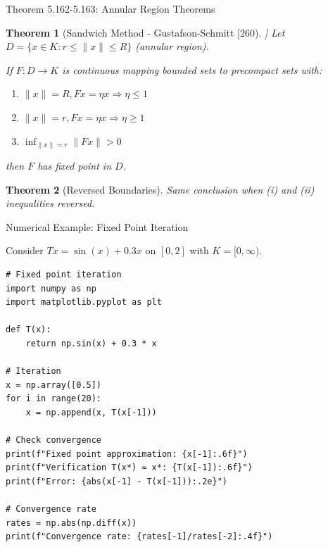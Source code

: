 \documentclass[aspectratio=169,10pt]{beamer}
\theoremstyle{plain}
\newtheorem*{theorem*}{Theorem}
\begin{document}
\begin{frame}{Theorem 5.162-5.163: Annular Region Theorems}
  \begin{theorem*}[Sandwich Method - Gustafson-Schmitt [260]]
    Let $D = \{x \in K : r \leq \|x\| \leq R\}$ (annular region).

    If $F: D \to K$ is continuous mapping bounded sets to precompact sets with:
    \begin{enumerate}
      \item $\|x\| = R, Fx = \eta x \Rightarrow \eta \leq 1$
      \item $\|x\| = r, Fx = \eta x \Rightarrow \eta \geq 1$
      \item $\inf_{\|x\|=r} \|Fx\| > 0$
    \end{enumerate}

    then $F$ has fixed point in $D$.
  \end{theorem*}

  \vspace{0.8em}

  \begin{theorem*}[Reversed Boundaries]
    Same conclusion when (i) and (ii) inequalities reversed.
  \end{theorem*}
\end{frame}

\begin{frame}[fragile]{Numerical Example: Fixed Point Iteration}
  \begin{example*}
    Consider $Tx = \sin(x) + 0.3x$ on $[0, 2]$ with $K = [0, \infty)$.
  \end{example*}

  \begin{lstlisting}
# Fixed point iteration
import numpy as np
import matplotlib.pyplot as plt

def T(x):
    return np.sin(x) + 0.3 * x

# Iteration
x = np.array([0.5])
for i in range(20):
    x = np.append(x, T(x[-1]))

# Check convergence
print(f"Fixed point approximation: {x[-1]:.6f}")
print(f"Verification T(x*) ≈ x*: {T(x[-1]):.6f}")
print(f"Error: {abs(x[-1] - T(x[-1])):.2e}")

# Convergence rate
rates = np.abs(np.diff(x))
print(f"Convergence rate: {rates[-1]/rates[-2]:.4f}")
  \end{lstlisting}
\end{frame}
\end{document}
